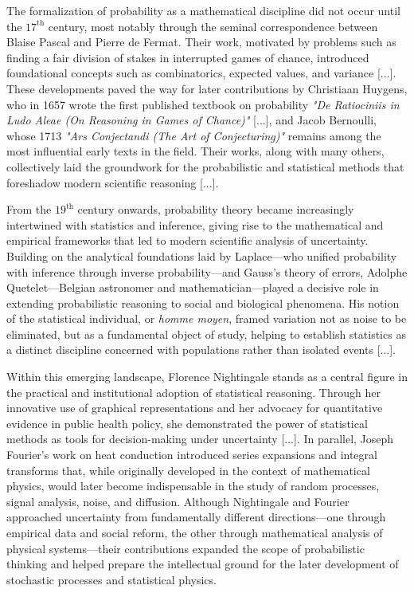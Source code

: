 \medskip

The formalization of probability as a mathematical discipline did not occur until the $17^{\text{th}}$ century, most notably through the seminal correspondence between Blaise Pascal and Pierre de Fermat. Their work, motivated by problems such as finding a fair division of stakes in interrupted games of chance, introduced foundational concepts such as combinatorics, expected values, and variance [...]. These developments paved the way for later contributions by Christiaan Huygens, who in 1657 wrote the first published textbook on probability \textit{"De Ratiociniis in Ludo Aleae (On Reasoning in Games of Chance)"} [...], and Jacob Bernoulli, whose 1713 \textit{"Ars Conjectandi (The Art of Conjecturing)"} remains among the most influential early texts in the field. Their works, along with many others, collectively laid the groundwork for the probabilistic and statistical methods that foreshadow modern scientific reasoning [...].

\medskip

From the $19^{\text{th}}$ century onwards, probability theory became increasingly intertwined with statistics and inference, giving rise to the mathematical and empirical frameworks that led to modern scientific analysis of uncertainty. Building on the analytical foundations laid by Laplace—who unified probability with inference through inverse probability—and Gauss’s theory of errors, Adolphe Quetelet—Belgian astronomer and mathematician—played a decisive role in extending probabilistic reasoning to social and biological phenomena. His notion of the statistical individual, or \textit{homme moyen}, framed variation not as noise to be eliminated, but as a fundamental object of study, helping to establish statistics as a distinct discipline concerned with populations rather than isolated events [...].

Within this emerging landscape, Florence Nightingale stands as a central figure in the practical and institutional adoption of statistical reasoning. Through her innovative use of graphical representations and her advocacy for quantitative evidence in public health policy, she demonstrated the power of statistical methods as tools for decision-making under uncertainty [...]. In parallel, Joseph Fourier’s work on heat conduction introduced series expansions and integral transforms that, while originally developed in the context of mathematical physics, would later become indispensable in the study of random processes, signal analysis, noise, and diffusion. Although Nightingale and Fourier approached uncertainty from fundamentally different directions—one through empirical data and social reform, the other through mathematical analysis of physical systems—their contributions expanded the scope of probabilistic thinking and helped prepare the intellectual ground for the later development of stochastic processes and statistical physics.

